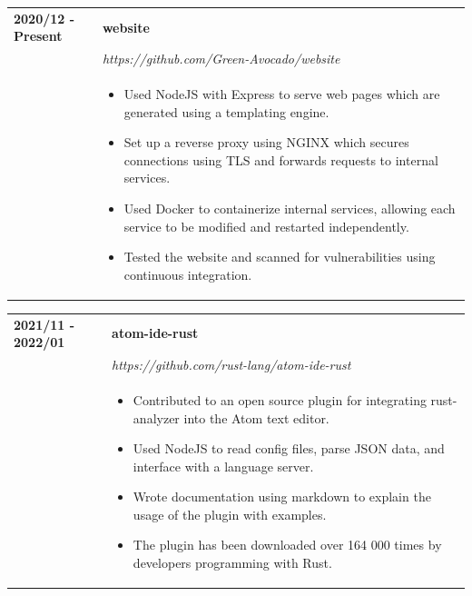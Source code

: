 \documentclass[letterpaper]{article}
\begin{document}
        \begin{tabular}{p{} p{}}
            \textbf{2020/12 - Present} & \textbf{website} \\
            & \emph{https://github.com/Green-Avocado/website} \\
            & \begin{itemize}
                \item Used NodeJS with Express to serve web pages which are generated using a templating
                    engine.
                \item Set up a reverse proxy using NGINX which secures connections using TLS and forwards
                    requests to internal services.
                \item Used Docker to containerize internal services, allowing each service to be modified
                    and restarted independently.
                \item Tested the website and scanned for vulnerabilities using continuous integration.
            \end{itemize}
            \\
        \end{tabular}

        \begin{tabular}{p{} p{}}
            \textbf{2021/11 - 2022/01} & \textbf{atom-ide-rust} \\
            & \emph{https://github.com/rust-lang/atom-ide-rust} \\
            & \begin{itemize}
                \item Contributed to an open source plugin for integrating rust-analyzer into the Atom
                    text editor.
                \item Used NodeJS to read config files, parse JSON data, and interface with a language
                    server.
                \item Wrote documentation using markdown to explain the usage of the plugin with examples.
                \item The plugin has been downloaded over 164 000 times by developers programming with
                    Rust.
            \end{itemize}
            \\
        \end{tabular}
\end{document}
